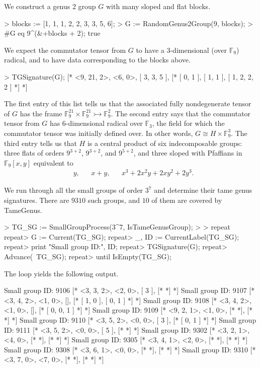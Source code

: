 \documentclass{documentation}
\begin{document}
\begin{example}[ManyBlocks]
    We construct a genus 2 group $G$ with many sloped and flat blocks. 
\begin{code}
> blocks := [1, 1, 1, 2, 2, 3, 3, 5, 6];
> G := RandomGenus2Group(9, blocks);
> #G eq 9^(&+blocks + 2);
true    
\end{code}

    We expect the commutator tensor from $G$ to have a $3$-dimensional (over $\mathbb{F}_9$) radical, and to have data corresponding to the blocks above.
\begin{code}
> TGSignature(G);
[* <9, 21, 2>, <6, 0>,
    [ 3, 3, 5 ],
    [*
        [ 0, 1 ],
        [ 1, 1 ],
        [ 1, 2, 2, 2 ]
    *]
*]    
\end{code}

    The first entry of this list tells us that the associated fully nondegenerate tensor of $G$ has the frame $\mathbb{F}_9^{21}\times\mathbb{F}_9^{21}\rightarrowtail \mathbb{F}_9^2$. The second entry says that the commutator tensor from $G$ has $6$-dimensional radical over $\mathbb{F}_3$, the field for which the commutator tensor was initially defined over. In other words, $G\cong H\times \mathbb{F}_9^3$. The third entry tells us that $H$ is a central product of six indecomposable groups: three flats of orders $9^{3+2}$, $9^{3+2}$, and $9^{5+2}$, and three sloped with Pfaffians in $\mathbb{F}_9[x,y]$ equivalent to 
    \begin{align*}
        & y, & & x + y, & & x^3 + 2x^2y + 2xy^2 + 2y^3.
    \end{align*}
\end{example}

\begin{example}[MoreSmallGroups]
    We run through all the small groups of order $3^7$ and determine their tame genus signatures. There are $9310$ such groups, and $10$ of them are covered by \textsf{TameGenus}.
\begin{code}
> TG_SG := SmallGroupProcess(3^7, IsTameGenusGroup);
> 
> repeat
repeat>     G := Current(TG_SG);
repeat>     _, ID := CurrentLabel(TG_SG);
repeat>     print "Small group ID:", ID;
repeat>     TGSignature(G);
repeat>     Advance(~TG_SG);
repeat> until IsEmpty(TG_SG);    
\end{code}

    The loop yields the following output.
\begin{code}
Small group ID: 9106
[* <3, 3, 2>, <2, 0>,
    [ 3 ],
    [* *]
*]
Small group ID: 9107
[* <3, 4, 2>, <1, 0>,
    [],
    [*
        [ 1, 0 ],
        [ 0, 1 ]
    *]
*]
Small group ID: 9108
[* <3, 4, 2>, <1, 0>,
    [],
    [*
        [ 0, 0, 1 ]
    *]
*]
Small group ID: 9109
[* <9, 2, 1>, <1, 0>, [* *], [* *] *]
Small group ID: 9110
[* <3, 5, 2>, <0, 0>,
    [ 3 ],
    [*
        [ 0, 1 ]
    *]
*]
Small group ID: 9111
[* <3, 5, 2>, <0, 0>,
    [ 5 ],
    [* *]
*]
Small group ID: 9302
[* <3, 2, 1>, <4, 0>, [* *], [* *] *]
Small group ID: 9305
[* <3, 4, 1>, <2, 0>, [* *], [* *] *]
Small group ID: 9308
[* <3, 6, 1>, <0, 0>, [* *], [* *] *]
Small group ID: 9310
[* <3, 7, 0>, <7, 0>, [* *], [* *] *]    
\end{code}
\end{example}
\end{document}
